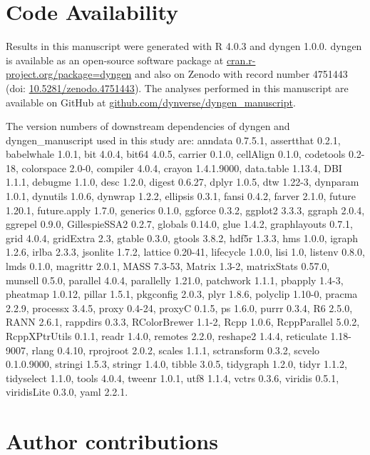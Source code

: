 \documentclass[10pt, a4paper]{article}
\begin{document}
\section{Code Availability}\label{code-availability}

Results in this manuscript were generated with R 4.0.3 and dyngen 1.0.0.
dyngen is available as an open-source software package at
\href{https://cran.r-project.org/package=dyngen}{cran.r-project.org/package=dyngen}
and also on Zenodo with record number 4751443 (doi:
\href{https://doi.org/10.5281/zenodo.4751443}{10.5281/zenodo.4751443}).
The analyses performed in this manuscript are available on GitHub at
\href{https://github.com/dynverse/dyngen_manuscript}{github.com/dynverse/dyngen\_manuscript}.

The version numbers of downstream dependencies of dyngen and
dyngen\_manuscript used in this study are: anndata 0.7.5.1, assertthat
0.2.1, babelwhale 1.0.1, bit 4.0.4, bit64 4.0.5, carrier 0.1.0,
cellAlign 0.1.0, codetools 0.2-18, colorspace 2.0-0, compiler 4.0.4,
crayon 1.4.1.9000, data.table 1.13.4, DBI 1.1.1, debugme 1.1.0, desc
1.2.0, digest 0.6.27, dplyr 1.0.5, dtw 1.22-3, dynparam 1.0.1, dynutils
1.0.6, dynwrap 1.2.2, ellipsis 0.3.1, fansi 0.4.2, farver 2.1.0, future
1.20.1, future.apply 1.7.0, generics 0.1.0, ggforce 0.3.2, ggplot2
3.3.3, ggraph 2.0.4, ggrepel 0.9.0, GillespieSSA2 0.2.7, globals 0.14.0,
glue 1.4.2, graphlayouts 0.7.1, grid 4.0.4, gridExtra 2.3, gtable 0.3.0,
gtools 3.8.2, hdf5r 1.3.3, hms 1.0.0, igraph 1.2.6, irlba 2.3.3,
jsonlite 1.7.2, lattice 0.20-41, lifecycle 1.0.0, lisi 1.0, listenv
0.8.0, lmds 0.1.0, magrittr 2.0.1, MASS 7.3-53, Matrix 1.3-2,
matrixStats 0.57.0, munsell 0.5.0, parallel 4.0.4, parallelly 1.21.0,
patchwork 1.1.1, pbapply 1.4-3, pheatmap 1.0.12, pillar 1.5.1, pkgconfig
2.0.3, plyr 1.8.6, polyclip 1.10-0, pracma 2.2.9, processx 3.4.5, proxy
0.4-24, proxyC 0.1.5, ps 1.6.0, purrr 0.3.4, R6 2.5.0, RANN 2.6.1,
rappdirs 0.3.3, RColorBrewer 1.1-2, Rcpp 1.0.6, RcppParallel 5.0.2,
RcppXPtrUtils 0.1.1, readr 1.4.0, remotes 2.2.0, reshape2 1.4.4,
reticulate 1.18-9007, rlang 0.4.10, rprojroot 2.0.2, scales 1.1.1,
sctransform 0.3.2, scvelo 0.1.0.9000, stringi 1.5.3, stringr 1.4.0,
tibble 3.0.5, tidygraph 1.2.0, tidyr 1.1.2, tidyselect 1.1.0, tools
4.0.4, tweenr 1.0.1, utf8 1.1.4, vctrs 0.3.6, viridis 0.5.1, viridisLite
0.3.0, yaml 2.2.1.

\section{Author contributions}\label{author-contributions}
\end{document}
